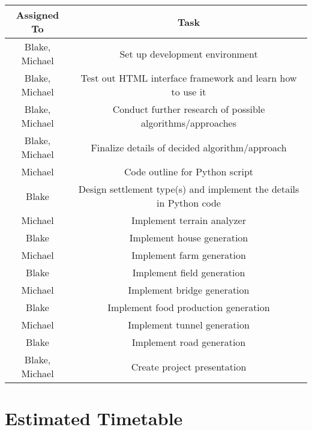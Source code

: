 \documentclass[11pt, oneside]{article}
\begin{document}
\begin{center}
\begin{tabular}{| c | c |} 
 	\hline
 	 Assigned To & Task \\ [0.5ex] 
 	\hline\hline
	Blake, Michael & Set up development environment \\
	\hline
	Blake, Michael & Test out HTML interface framework and learn how to use it \\
	\hline
	Blake, Michael & Conduct further research of possible algorithms/approaches \\
	\hline
	Blake, Michael & Finalize details of decided algorithm/approach \\
	\hline
	Michael & Code outline for Python script \\
	\hline
	Blake & Design settlement type(s) and implement the details in Python code \\
	\hline
	Michael & Implement terrain analyzer \\
	\hline
	Blake & Implement house generation \\
	\hline
	Michael & Implement farm generation \\
	\hline
	Blake & Implement field generation \\
	\hline
	Michael & Implement bridge generation \\
	\hline
	Blake & Implement food production generation \\
	\hline
	Michael & Implement tunnel generation \\
	\hline
	Blake & Implement road generation \\
	\hline
	Blake, Michael & Create project presentation \\
	\hline
\end{tabular}
\end{center}

\newpage


\section{Estimated Timetable}
\label{estimatedTimetable}
\end{document}
